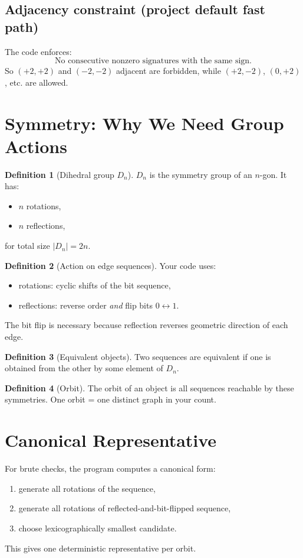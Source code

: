 \documentclass[12pt]{article}
\theoremstyle{definition}
\newtheorem{definition}{Definition}[section]
\begin{document}
\subsection{Adjacency constraint (project default fast path)}
The code enforces:
\[
\text{No consecutive nonzero signatures with the same sign.}
\]
So \((+2,+2)\) and \((-2,-2)\) adjacent are forbidden, while \((+2,-2)\), \((0,+2)\), etc. are allowed.

\section{Symmetry: Why We Need Group Actions}
\begin{definition}[Dihedral group \(D_n\)]
\(D_n\) is the symmetry group of an \(n\)-gon. It has:
\begin{itemize}
    \item \(n\) rotations,
    \item \(n\) reflections,
\end{itemize}
for total size \(|D_n|=2n\).
\end{definition}

\begin{definition}[Action on edge sequences]
Your code uses:
\begin{itemize}
    \item rotations: cyclic shifts of the bit sequence,
    \item reflections: reverse order \emph{and} flip bits \(0\leftrightarrow1\).
\end{itemize}
The bit flip is necessary because reflection reverses geometric direction of each edge.
\end{definition}

\begin{definition}[Equivalent objects]
Two sequences are equivalent if one is obtained from the other by some element of \(D_n\).
\end{definition}

\begin{definition}[Orbit]
The orbit of an object is all sequences reachable by these symmetries. One orbit = one distinct graph in your count.
\end{definition}

\section{Canonical Representative}
For brute checks, the program computes a canonical form:
\begin{enumerate}
    \item generate all rotations of the sequence,
    \item generate all rotations of reflected-and-bit-flipped sequence,
    \item choose lexicographically smallest candidate.
\end{enumerate}
This gives one deterministic representative per orbit.
\end{document}

